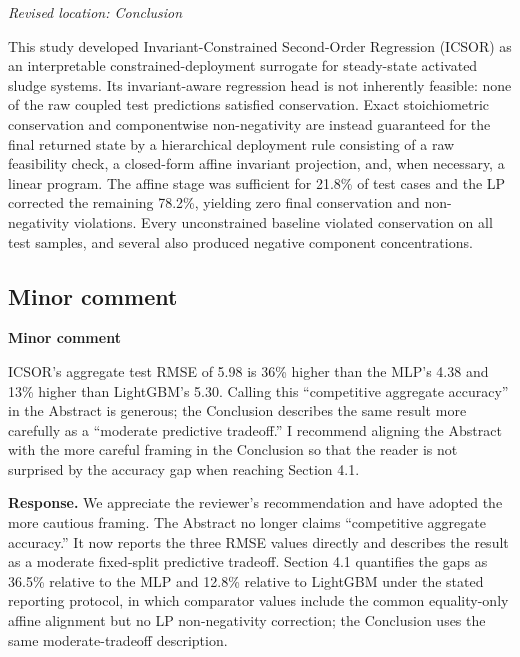 \documentclass[11pt,a4paper]{article}
\newcommand{\excerptlocation}[1]{\par\noindent\textit{Revised location: #1}\par}
\begin{document}
\excerptlocation{Conclusion}
\begin{revisionexcerpt}
This study developed Invariant-Constrained Second-Order Regression (ICSOR) as an interpretable constrained-deployment surrogate for steady-state activated sludge systems. Its invariant-aware regression head is not inherently feasible: none of the raw coupled test predictions satisfied conservation. Exact stoichiometric conservation and componentwise non-negativity are instead guaranteed for the final returned state by a hierarchical deployment rule consisting of a raw feasibility check, a closed-form affine invariant projection, and, when necessary, a linear program. The affine stage was sufficient for 21.8\% of test cases and the LP corrected the remaining 78.2\%, yielding zero final conservation and non-negativity violations. Every unconstrained baseline violated conservation on all test samples, and several also produced negative component concentrations.
\end{revisionexcerpt}

\subsection*{Minor comment}

\begin{reviewercomment}
\textbf{Minor comment}

ICSOR's aggregate test RMSE of 5.98 is 36\% higher than the MLP's 4.38 and 13\% higher than LightGBM's 5.30. Calling this ``competitive aggregate accuracy'' in the Abstract is generous; the Conclusion describes the same result more carefully as a ``moderate predictive tradeoff.'' I recommend aligning the Abstract with the more careful framing in the Conclusion so that the reader is not surprised by the accuracy gap when reaching Section 4.1.
\end{reviewercomment}

\noindent\textbf{Response.} We appreciate the reviewer's recommendation and have adopted the more cautious framing. The Abstract no longer claims ``competitive aggregate accuracy.'' It now reports the three RMSE values directly and describes the result as a moderate fixed-split predictive tradeoff. Section 4.1 quantifies the gaps as 36.5\% relative to the MLP and 12.8\% relative to LightGBM under the stated reporting protocol, in which comparator values include the common equality-only affine alignment but no LP non-negativity correction; the Conclusion uses the same moderate-tradeoff description.
\end{document}
